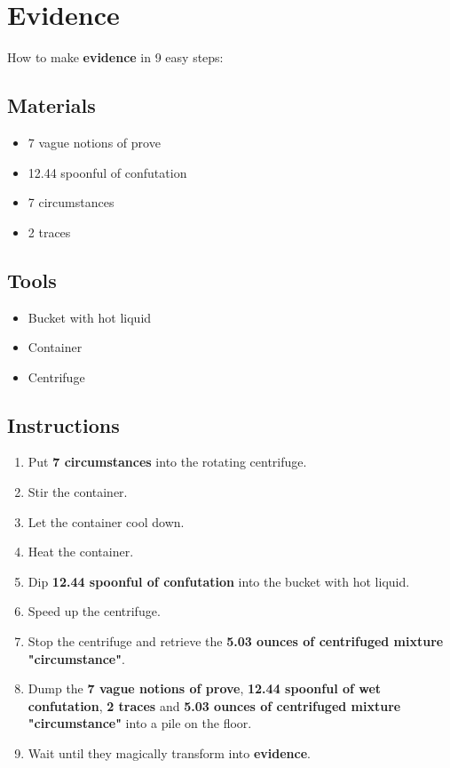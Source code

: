 \documentclass{article}
\begin{document}
\section{Evidence}How to make \textbf{evidence} in 9 easy steps:

\subsection{Materials}\begin{itemize}
\item 
7 vague notions of prove
\item 
12.44 spoonful of confutation
\item 
7 circumstances
\item 
2 traces
\end{itemize}
\subsection{Tools}\begin{itemize}
\item 
Bucket with hot liquid
\item 
Container
\item 
Centrifuge
\end{itemize}
\subsection{Instructions}\begin{enumerate}
\item 
Put \textbf{7 circumstances} into the rotating centrifuge.
\item 
Stir the container.
\item 
Let the container cool down.
\item 
Heat the container.
\item 
Dip \textbf{12.44 spoonful of confutation} into the bucket with hot liquid.
\item 
Speed up the centrifuge.
\item 
Stop the centrifuge and retrieve the \textbf{5.03 ounces of centrifuged mixture "circumstance"}.
\item 
Dump the \textbf{7 vague notions of prove}, \textbf{12.44 spoonful of wet confutation}, \textbf{2 traces} and \textbf{5.03 ounces of centrifuged mixture "circumstance"} into a pile on the floor.
\item 
Wait until they magically transform into \textbf{evidence}.
\end{enumerate}
\newpage
\end{document}
